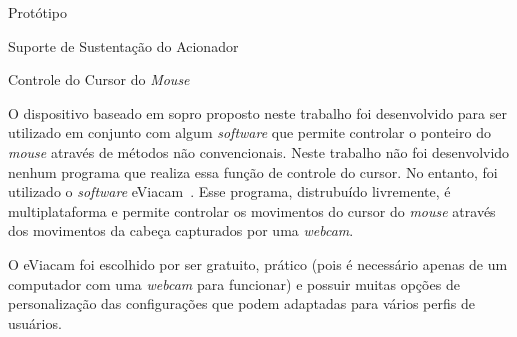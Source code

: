 \begin{chapter}{Protótipo}
\begin{section}{Suporte de Sustentação do Acionador}
\end{section}

\begin{section}{Controle do Cursor do \textit{Mouse}}

O dispositivo baseado em sopro proposto neste trabalho foi desenvolvido para ser
utilizado em conjunto com algum \textit{software} que permite controlar o
ponteiro do \textit{mouse} através de métodos não convencionais. Neste trabalho
não foi desenvolvido nenhum programa que realiza essa função de controle do
cursor. No entanto, foi utilizado o \textit{software} eViacam~\cite{eviacam}.
Esse programa, distrubuído livremente, é multiplataforma e permite controlar os
movimentos do cursor do \textit{mouse} através dos movimentos da cabeça
capturados por uma \textit{webcam}.

O eViacam foi escolhido por ser gratuito, prático (pois é necessário apenas de
um computador com uma \textit{webcam} para funcionar) e possuir muitas opções de
personalização das configurações que podem adaptadas para vários perfis de
usuários.  

 


\end{section}

\end{chapter}
